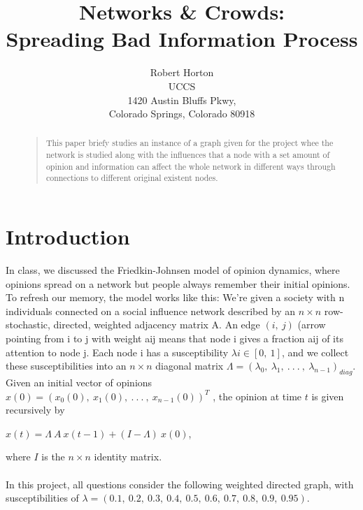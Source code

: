 \documentclass[letterpaper]{article}
\begin{document}
%
\title{Networks \& Crowds:\\Spreading Bad Information Process  }
\author{Robert Horton\\
UCCS\\
1420 Austin Bluffs Pkwy,\\
Colorado Springs, Colorado 80918\\
}
\maketitle

\begin{abstract}
\begin{quote}
This paper briefy studies an instance of a graph given for the project whee the network is studied along with the influences that a node with a set amount of opinion and information can affect the whole network in different ways through connections to different original existent nodes.
\end{quote}
\end{abstract}

\section{Introduction}
In class, we discussed the Friedkin-Johnsen model of opinion dynamics, where opinions spread on a network but people always remember their initial opinions. To refresh our memory, the model works like this: We’re given a society with n individuals connected on a social influence network described by an $n \times n$ row-stochastic, directed, weighted adjacency matrix A. An edge $(i, \  j)$ (arrow pointing from i to j with weight aij means that node i gives a fraction aij of its attention to node j. Each node i has a susceptibility $\lambda i \in [0, \ 1]$, and we collect these susceptibilities into an $n \times n$ diagonal matrix $\Lambda = (\lambda_0, \ \lambda_1, \ . \ . \ . \ , \ \lambda_{n-1})_{diag}$. Given an initial vector of opinions $x(0) = (x_0(0), \ x_1(0), \ . \ . \ . \ , \ x_{n-1}(0))^T$ , the opinion at time $t$ is given recursively by
\begin{center}
	$x(t) = \Lambda \ A \ x(t - 1) + (I - \Lambda) \ x(0)$,\\ 
\end{center}
where $I$ is the $n \times n$ identity matrix. \\ \\
In this project, all questions consider the following weighted directed graph, with susceptibilities of $\lambda = (0.1,\ 0.2,\ 0.3,\ 0.4, \ 0.5, \ 0.6, \ 0.7, \ 0.8,\ 0.9, \ 0.95)$.  
\end{document}
